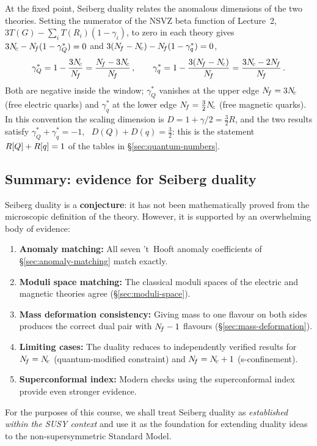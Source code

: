 \documentclass[11pt,a4paper]{article}
\begin{document}
At the fixed point, Seiberg duality relates the anomalous dimensions of the
two theories.  Setting the numerator of the NSVZ beta function of
Lecture~2, $3T(G) - \sum_i T(R_i)(1 - \gamma_i)$, to zero in each theory
gives $3N_{\!c} - N_{\!f}(1 - \gamma_Q^*) = 0$ and
$3(N_{\!f} - N_{\!c}) - N_{\!f}(1 - \gamma_q^*) = 0$, \ie
\[
  \gamma_Q^* = 1 - \frac{3\Nc}{\Nf} = \frac{\Nf - 3\Nc}{\Nf}\,,
  \qquad
  \gamma_q^* = 1 - \frac{3(\Nf - \Nc)}{\Nf} = \frac{3\Nc - 2\Nf}{\Nf}\,.
\]
Both are negative inside the window; $\gamma_Q^*$ vanishes at the upper edge
$N_{\!f} = 3N_{\!c}$ (free electric quarks) and $\gamma_q^*$ at the lower edge
$N_{\!f} = \tfrac{3}{2}N_{\!c}$ (free magnetic quarks).  In this convention the
scaling dimension is $D = 1 + \gamma/2 = \tfrac{3}{2}R$, and the two results
satisfy $\gamma_Q^* + \gamma_q^* = -1$, \ie\ $D(Q) + D(q) = \tfrac{3}{2}$:
this is the statement $R[Q] + R[q] = 1$ of the tables in
\S\ref{sec:quantum-numbers}.

\subsection{Summary: evidence for Seiberg duality}

\begin{tcolorbox}[
  enhanced,
  colback=yellow!5!white,
  colframe=yellow!60!black,
  fonttitle=\bfseries,
  title={Seiberg Duality: Status as a Conjecture}
]
Seiberg duality is a \textbf{conjecture}: it has not been mathematically
proved from the microscopic definition of the theory.  However, it is
supported by an overwhelming body of evidence:

\begin{enumerate}
  \item \textbf{Anomaly matching:} All seven 't~Hooft anomaly
    coefficients of \S\ref{sec:anomaly-matching} match exactly.
  \item \textbf{Moduli space matching:} The classical moduli spaces of the
    electric and magnetic theories agree (\S\ref{sec:moduli-space}).
  \item \textbf{Mass deformation consistency:} Giving mass to one flavour
    on both sides produces the correct dual pair with $N_{\!f} - 1$ flavours
    (\S\ref{sec:mass-deformation}).
  \item \textbf{Limiting cases:} The duality reduces to independently
    verified results for $N_{\!f} = N_{\!c}$ (quantum-modified constraint) and
    $N_{\!f} = N_{\!c} + 1$ (s-confinement).
  \item \textbf{Superconformal index:} Modern checks using the
    superconformal index provide even stronger evidence.
\end{enumerate}

For the purposes of this course, we shall treat Seiberg duality as
\emph{established within the SUSY context} and use it as the foundation
for extending duality ideas to the non-supersymmetric Standard Model.
\end{tcolorbox}
\end{document}
